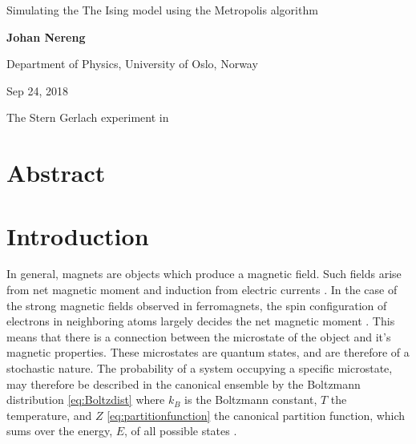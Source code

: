 \documentclass[%
oneside,                 %
final,                   %
10pt]{article}
\begin{document}

\newcommand{\exercisesection}[1]{\subsection*{#1}}






\thispagestyle{empty}

\begin{center}
{\LARGE\bf
\begin{spacing}{1.25}
Simulating the The Ising model using the Metropolis algorithm
\end{spacing}
}
\end{center}


\begin{center}
{\bf Johan Nereng}
\end{center}

    \begin{center}
\centerline{{\small Department of Physics, University of Oslo, Norway}}
\end{center}
    

\begin{center}
Sep 24, 2018
\end{center}

\vspace{1cm}
The Stern Gerlach experiment in \newline
\section{Abstract}

\section{Introduction}
In general, magnets are objects which produce a magnetic field. Such fields arise from net magnetic moment and induction from electric currents  \cite{FeynmanMM}. In the case of the strong magnetic fields observed in ferromagnets, the spin configuration of electrons in neighboring atoms largely decides the net magnetic moment \cite{FeynmanFM}. This means that there is a connection between the microstate of the object and it's magnetic properties. These microstates are quantum states, and are therefore of a stochastic nature. The probability of a system occupying a specific microstate, may therefore be described in the canonical ensemble by the Boltzmann distribution \eqref{eq:Boltzdist} where $k_B$ is the Boltzmann constant, $T$ the temperature,  and $Z$ \eqref{eq:partitionfunction} the canonical partition function, which sums over the energy, $E$, of all possible states \cite{HJ-SP}. 
\end{document}
